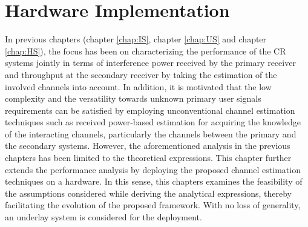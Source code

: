 \chapter{Hardware Implementation}
\label{chap:Field}

In previous chapters (chapter \ref{chap:IS}, chapter \ref{chap:US} and chapter \ref{chap:HS}), the focus has been on characterizing the performance of the CR systems jointly in terms of interference power received by the primary receiver and throughput at the secondary receiver by taking the estimation of the involved channels into account. In addition, it is motivated that the low complexity and the versatility towards unknown primary user signals requirements can be satisfied by employing unconventional channel estimation techniques such as received power-based estimation for acquiring the knowledge of the interacting channels, particularly the channels between the primary and the secondary systems. However, the aforementioned analysis in the previous chapters has been limited to the theoretical expressions. This chapter further extends the performance analysis by deploying the proposed channel estimation techniques on a hardware. In this sense, this chapters examines the feasibility of the assumptions considered while deriving the analytical expressions, thereby facilitating the evolution of the proposed framework. With no loss of generality, an underlay system is considered for the deployment.    


